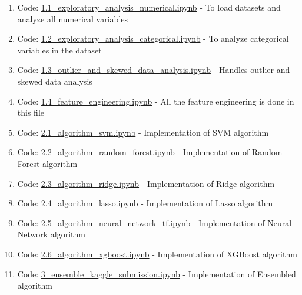 \documentclass[sigconf]{acmart}
\begin{document}
    \begin{enumerate}
    	\item Code: \href{https://github.com/bigdata-i523/hid306/blob/master/project/code/1.1_exploratory_analysis_numerical.ipynb}{1.1\_exploratory\_analysis\_numerical.ipynb} - To load datasets and analyze all numerical variables
    	
    	\item Code: \href{https://github.com/bigdata-i523/hid306/blob/master/project/code/1.2_exploratory_analysis_categorical.ipynb}{1.2\_exploratory\_analysis\_categorical.ipynb} - To analyze categorical variables in the dataset
    	
    	\item Code: \href{https://github.com/bigdata-i523/hid306/blob/master/project/code/1.3_outlier_and_skewed_data_analysis.ipynb}{1.3\_outlier\_and\_skewed\_data\_analysis.ipynb} - Handles outlier and skewed data analysis
    	
    	\item Code: \href{https://github.com/bigdata-i523/hid306/blob/master/project/code/1.4_feature_engineering.ipynb}{1.4\_feature\_engineering.ipynb} - All the feature engineering is done in this file
    	
    	\item Code: \href{https://github.com/bigdata-i523/hid306/blob/master/project/code/2.1_algorithm_svm.ipynb}{2.1\_algorithm\_svm.ipynb} - Implementation of SVM algorithm
    	
    	\item Code: \href{https://github.com/bigdata-i523/hid306/blob/master/project/code/2.2_algorithm_random_forest.ipynb}{2.2\_algorithm\_random\_forest.ipynb} - Implementation of Random Forest algorithm
    	
    	\item Code: \href{https://github.com/bigdata-i523/hid306/blob/master/project/code/2.3_algorithm_ridge.ipynb}{2.3\_algorithm\_ridge.ipynb} - Implementation of Ridge algorithm
    	
    	\item Code: \href{https://github.com/bigdata-i523/hid306/blob/master/project/code/2.4_algorithm_lasso.ipynb}{2.4\_algorithm\_lasso.ipynb} - Implementation of Lasso algorithm
    	
    	\item Code: \href{https://github.com/bigdata-i523/hid306/blob/master/project/code/2.5_algorithm_neural_network_tf.ipynb}{2.5\_algorithm\_neural\_network\_tf.ipynb} - Implementation of Neural Network algorithm
    	
    	\item Code: \href{https://github.com/bigdata-i523/hid306/blob/master/project/code/2.6_algorithm_xgboost.ipynb}{2.6\_algorithm\_xgboost.ipynb} - Implementation of XGBoost algorithm
    	
    	\item Code: \href{https://github.com/bigdata-i523/hid306/blob/master/project/code/3_ensemble_kaggle_submission.ipynb}{3\_ensemble\_kaggle\_submission.ipynb} - Implementation of Ensembled algorithm
    \end{enumerate}    
    
\end{document}
